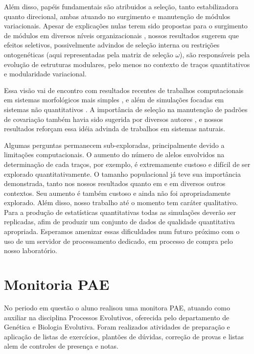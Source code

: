\documentclass[a4paper, 12pt, titlepage, onecolumn]{article}
\numberwithin{equation}{section}
\numberwithin{table}{section}
\begin{document}
Além disso, papéis fundamentais são atribuidos a seleção,
tanto estabilizadora quanto direcional, ambas atuando no surgimento e
manutenção de módulos variacionais. Apesar de explicações nulas terem
sido propostas para o surgimento de módulos em diversos níveis
organizacionais \citep{Lynch2007, Wagner2007}, nossos resultados sugerem
que efeitos seletivos, possivelmente advindos de seleção interna ou
restrições ontogenéticas (aqui representadas pela matriz de seleção
$\omega$), são responsáveis pela evolução de estruturas modulares, pelo
menos no contexto de traços quantitativos e modularidade variacional. 

Essa visão vai de encontro com resultados recentes de trabalhos
computacionais em sistemas morfológicos mais simples
\citep{Pavlicev2010}, e além de simulações focadas em sistemas não
quantitativos \citep{Ancel2000,Espinosa-Soto2010}. A importância de
seleção na manutenção de padrões de covariação também havia sido
sugerida por diversos autores \citep{Cheverud1984, Marroig2001,Porto2008},
e nossos resultados reforçam essa idéia advinda de trabalhos em sistemas
naturais.

Algumas perguntas permanecem sub-exploradas, principalmente devido a
limitações computacionais. O aumento do número de alelos envolvidos na
determinação de cada traços, por exemplo, é extremamente custoso e
difícil de ser explorado quantitativamente. O tamanho populacional já
teve sua importância demonstrada, tanto nos nossos resultados quanto em
\cite{Jones2003} e em diversos outros contextos. Seu aumento é também
custoso e ainda não foi apropriadamente explorado. Além disso, nosso
trabalho até o momento tem caráter qualitativo. Para a
produção de estatísticas quantitativas todas as simulações deverão ser
replicadas, afim de produzir um conjunto de dados de qualidade
quantitativa apropriada.  Esperamos amenizar essas dificuldades num
futuro próximo com o uso de um servidor de processamento dedicado, em
processo de compra pelo nosso laboratório.

\section{Monitoria PAE}

No periodo em questão o aluno realisou uma monitora PAE, atuando como
auxiliar na disciplina Processos Evolutivos, oferecida pelo departamento
de Genética e Biologia Evolutiva. Foram realizados atividades de
preparação e aplicação de listas de exercícios, plantões de dúvidas,
correção de provas e listas alem de controles de presença e notas.
\end{document}
